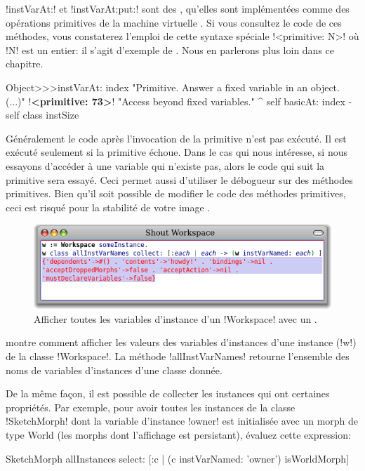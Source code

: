 \documentclass[a4paper,10pt,twoside]{book}
\begin{document}
\ct!instVarAt:! et \ct!instVarAt:put:! sont des , \ie qu'elles sont implémentées comme des opérations primitives de la machine virtuelle \pharo.
Si vous consultez le code de ces méthodes, vous constaterez l'emploi de cette
syntaxe spéciale
\ct!<primitive: N>! où \ct!N! est un entier:
il s'agit d'exemple de . Nous en parlerons plus loin dans ce chapitre. %

\begin{code}{}
Object>>>instVarAt: index 
	"Primitive. Answer a fixed variable in an object. (...)"
	!\textbf{<primitive: 73>}!
	"Access beyond fixed variables."
	^ self basicAt: index - self class instSize		
\end{code}

Généralement le code après l'invocation de la primitive n'est pas exécuté. Il est exécuté seulement si la primitive échoue. Dans le cas qui nous intéresse, si nous essayons d'accéder à une variable qui n'existe pas, alors le code qui suit la primitive sera essayé. Ceci permet aussi d'utiliser le débogueur sur des méthodes primitives.
Bien qu'il soit possible de modifier le code des méthodes primitives, ceci est risqué pour la stabilité de votre image \pharo.

\begin{figure}[ht]\centering
	\includegraphics[width=\linewidth]{allInstanceVariables}
	\caption{Afficher toutes les variables d'instance d'un \ct!Workspace! avec un .}
\end{figure}

 montre comment afficher les valeurs des variables d'instances d'une instance (\ct!w!)  de la classe \ct!Workspace!.
La méthode \ct!allInstVarNames! retourne l'ensemble des noms de variables d'instances d'une classe donnée.

De la même façon, il est possible de collecter les instances qui ont certaines propriétés.
Par exemple, pour avoir toutes les instances de la classe \ct!SketchMorph! dont la variable d'instance \ct!owner! est initialisée avec un morph de type World (\ie les morphs dont l'affichage est persistant), évaluez cette expression:
\begin{code}{}
SketchMorph allInstances select: [:c | (c instVarNamed: 'owner') isWorldMorph]
\end{code}
\end{document}
